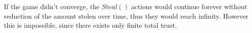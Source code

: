 \begin{proofsketch}
   If the game didn't converge, the $Steal\left(\right)$ actions would continue forever without reduction of the amount
   stolen over time, thus they would reach infinity. However this is impossible, since there exists only finite total
   trust.
\end{proofsketch}
